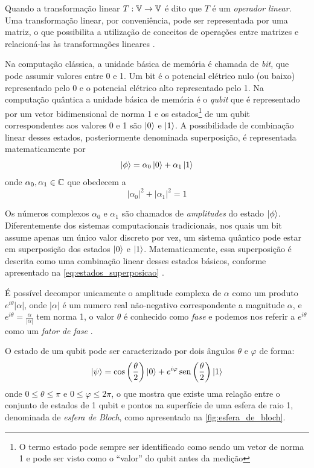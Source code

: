 Quando a transformação linear $T:\operatorname{\mathbb{V}}\rightarrow\operatorname{\mathbb{V}}$ é dito que $T$ é um \textit{operador linear}. Uma transformação linear, por conveniência, pode ser representada por uma matriz, o que possibilita a utilização de conceitos de operações entre matrizes e relacioná-las às transformações lineares \cite{dettman1986introduction}.

Na computação clássica, a unidade básica de memória é chamada de \textit{bit}, que pode assumir valores entre 0 e 1. Um bit é o potencial elétrico nulo (ou baixo) representado pelo 0 e o potencial elétrico alto representado pelo 1. Na computação quântica a unidade básica de memória é o \textit{qubit} que é representado por um vetor bidimensional de norma 1 e os estados\footnote{O termo estado pode sempre ser identificado como sendo um vetor de norma 1 e pode ser visto como o ``valor'' do qubit antes da medição} de um qubit correspondentes aos valores 0 e 1 são $\ket{0}$ e $\ket{1}$. A possibilidade de combinação linear desses estados, posteriormente denominada superposição, é representada matematicamente por
    \begin{equation}
        \label{eq:estados_superposicao}
        \ket{\phi}=\alpha_0\ket{0}+\alpha_1\ket{1}
    \end{equation}
    onde $\alpha_0, \alpha_1\in\operatorname{\mathbb{C}}$ que obedecem a
    $$
        |\alpha_0|^2+|\alpha_1|^2=1
    $$
    
Os números complexos $\alpha_0$ e $\alpha_1$ são chamados de \textit{amplitudes} do estado $\ket{\phi}$. Diferentemente dos sistemas computacionais tradicionais, nos quais um bit assume apenas um único valor discreto por vez, um sistema quântico pode estar em superposição dos estados $\ket{0}$ e $\ket{1}$. Matematicamente, essa superposição é descrita como uma combinação linear desses estados básicos, conforme apresentado na \autoref{eq:estados_superposicao} \cite[pág. 13]{nielsen_quantum_2002}.
    
É possível decompor unicamente o amplitude complexa de $\alpha$ como um produto $e^{i\theta}|\alpha|$, onde $|\alpha|$ é um numero real não-negativo correspondente a magnitude $\alpha$, e $e^{i\theta}=\frac{\alpha}{|\alpha|}$ tem norma 1, o valor $\theta$ é conhecido como \textit{fase} e podemos nos referir a $e^{i\theta}$ como um \textit{fator de fase} \cite{Rieffel2000}.

O estado de um qubit pode ser caracterizado por dois ângulos $\theta$ e $\varphi$ de forma:
$$
    \label{eq:ket_psi}
    \ket{\psi}=\cos\left(\dfrac{\theta}{2}\right)\ket{0}+e^{i\varphi}\operatorname{sen}\left(\dfrac{\theta}{2}\right)\ket{1}
$$
onde $0\leq\theta\leq\pi$ e $0\leq\varphi\leq2\pi$, o que mostra que existe uma relação entre o conjunto de estados de 1 qubit e pontos na superfície de uma esfera de raio 1, denominada de \textit{esfera de Bloch}, como apresentado na \autoref{fig:esfera_de_bloch}.
    

